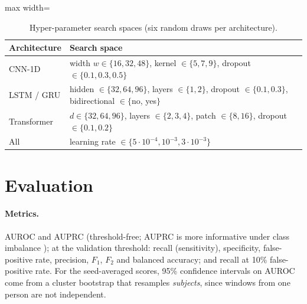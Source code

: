 \begin{table}[ht]
\centering
\small
\caption{Hyper-parameter search spaces (six random draws per architecture).}
\label{tab:space}
\begin{adjustbox}{max width=\textwidth}
\begin{tabular}{ll}
\toprule
Architecture & Search space \\
\midrule
CNN-1D & width $w\in\{16,32,48\}$, kernel $\in\{5,7,9\}$, dropout $\in\{0.1,0.3,0.5\}$ \\
LSTM / GRU & hidden $\in\{32,64,96\}$, layers $\in\{1,2\}$, dropout $\in\{0.1,0.3\}$, bidirectional $\in\{$no, yes$\}$ \\
Transformer & $d\in\{32,64,96\}$, layers $\in\{2,3,4\}$, patch $\in\{8,16\}$, dropout $\in\{0.1,0.2\}$ \\
All & learning rate $\in\{5\cdot10^{-4},10^{-3},3\cdot10^{-3}\}$ \\
\bottomrule
\end{tabular}
\end{adjustbox}
\end{table}

\section{Evaluation}
\label{sec:evaluation}

\paragraph{Metrics.} AUROC and AUPRC (threshold-free; AUPRC is more informative under class imbalance
\parencite{saito2015prc}); at the validation threshold: recall (sensitivity), specificity, false-positive
rate, precision, $F_1$, $F_2$ and balanced accuracy; and recall at 10\% false-positive rate. For the
seed-averaged scores, 95\% confidence intervals on AUROC come from a cluster bootstrap that resamples
\emph{subjects}, since windows from one person are not independent.

